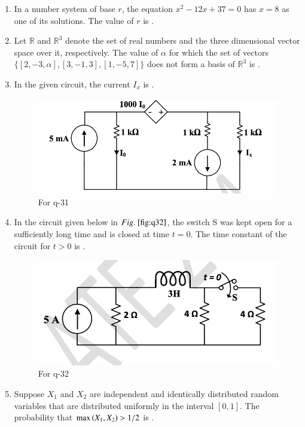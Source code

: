 \documentclass[journal,12pt,onecolumn]{IEEEtran}
\theoremstyle{remark}
\begin{document}
\begin{enumerate}
\item In a number system of base $r$, the equation $x^2 - 12x + 37 = 0$ has $x = 8$ as one of its solutions. The value of $r$ is \underline{\hspace{2cm}}.

\hfill{}

\item Let $\mathbb{R}$ and $\mathbb{R}^3$ denote the set of real numbers and the three dimensional vector space over it, respectively. The value of $\alpha$ for which the set of vectors $\{[2, -3, \alpha], [3, -1, 3], [1, -5, 7]\}$ does not form a basis of $\mathbb{R}^3$ is \underline{\hspace{2cm}}.

\hfill{}

\item In the given circuit, the current $I_x$  is \underline{\hspace{2cm}}.
\begin{figure}[H]
    \centering
    \includegraphics[width=0.5\columnwidth]{q31.png}
    \caption{For q-31}
    \label{fig:q31}
\end{figure}
\hfill{}

\item In the circuit given below in $\figref{fig:q32}$, the switch S was kept open for a sufficiently long time and is closed at time $t = 0$. The time constant  of the circuit for $t > 0$ is \underline{\hspace{2cm}}.
\begin{figure}[H]
    \centering
    \includegraphics[width=0.5\columnwidth]{q32.png}
    \caption{For q-32}
    \label{fig:q32}
\end{figure}
\hfill{}

\item Suppose $X_1$ and $X_2$ are independent and identically distributed random variables that are distributed uniformly in the interval $[0, 1]$. The probability that $\max\left(X_1, X_2\right) > 1/2$ is \underline{\hspace{2cm}}.
\hfill{}


\end{enumerate}
\end{document}
